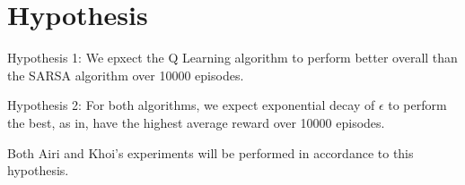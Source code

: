 \section{Hypothesis}

Hypothesis 1: We epxect the Q Learning algorithm to perform better overall than the SARSA algorithm over 10000 episodes.

Hypothesis 2: For both algorithms, we expect exponential decay of $\epsilon$ to perform the best, as in, have the highest average reward over 10000 episodes.

Both Airi and Khoi's experiments will be performed in accordance to this hypothesis.
